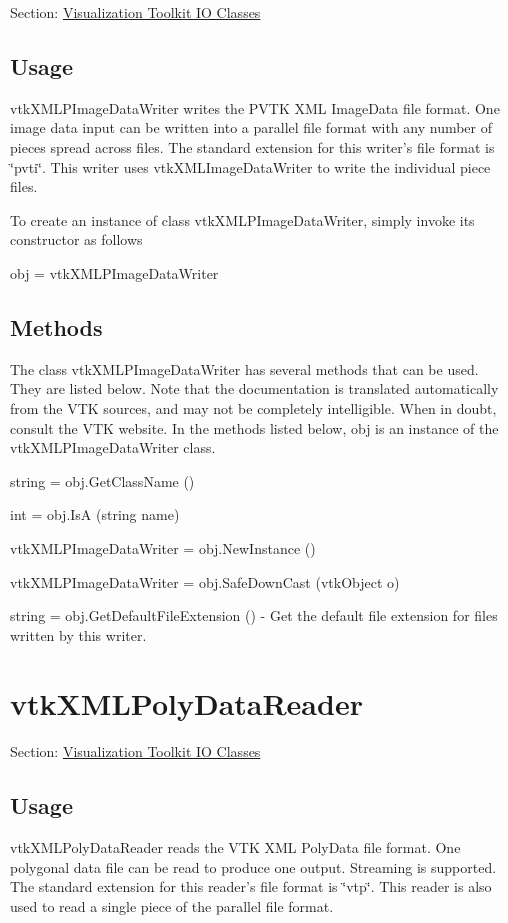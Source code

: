Section\-: \hyperlink{sec_vtkio}{Visualization Toolkit I\-O Classes} \hypertarget{vtkwidgets_vtkxyplotwidget_Usage}{}\subsection{Usage}\label{vtkwidgets_vtkxyplotwidget_Usage}
vtk\-X\-M\-L\-P\-Image\-Data\-Writer writes the P\-V\-T\-K X\-M\-L Image\-Data file format. One image data input can be written into a parallel file format with any number of pieces spread across files. The standard extension for this writer's file format is \char`\"{}pvti\char`\"{}. This writer uses vtk\-X\-M\-L\-Image\-Data\-Writer to write the individual piece files.

To create an instance of class vtk\-X\-M\-L\-P\-Image\-Data\-Writer, simply invoke its constructor as follows \begin{DoxyVerb}  obj = vtkXMLPImageDataWriter
\end{DoxyVerb}
 \hypertarget{vtkwidgets_vtkxyplotwidget_Methods}{}\subsection{Methods}\label{vtkwidgets_vtkxyplotwidget_Methods}
The class vtk\-X\-M\-L\-P\-Image\-Data\-Writer has several methods that can be used. They are listed below. Note that the documentation is translated automatically from the V\-T\-K sources, and may not be completely intelligible. When in doubt, consult the V\-T\-K website. In the methods listed below, {\ttfamily obj} is an instance of the vtk\-X\-M\-L\-P\-Image\-Data\-Writer class. 
\begin{DoxyItemize}
\item {\ttfamily string = obj.\-Get\-Class\-Name ()}  
\item {\ttfamily int = obj.\-Is\-A (string name)}  
\item {\ttfamily vtk\-X\-M\-L\-P\-Image\-Data\-Writer = obj.\-New\-Instance ()}  
\item {\ttfamily vtk\-X\-M\-L\-P\-Image\-Data\-Writer = obj.\-Safe\-Down\-Cast (vtk\-Object o)}  
\item {\ttfamily string = obj.\-Get\-Default\-File\-Extension ()} -\/ Get the default file extension for files written by this writer.  
\end{DoxyItemize}\hypertarget{vtkio_vtkxmlpolydatareader}{}\section{vtk\-X\-M\-L\-Poly\-Data\-Reader}\label{vtkio_vtkxmlpolydatareader}
Section\-: \hyperlink{sec_vtkio}{Visualization Toolkit I\-O Classes} \hypertarget{vtkwidgets_vtkxyplotwidget_Usage}{}\subsection{Usage}\label{vtkwidgets_vtkxyplotwidget_Usage}
vtk\-X\-M\-L\-Poly\-Data\-Reader reads the V\-T\-K X\-M\-L Poly\-Data file format. One polygonal data file can be read to produce one output. Streaming is supported. The standard extension for this reader's file format is \char`\"{}vtp\char`\"{}. This reader is also used to read a single piece of the parallel file format.

